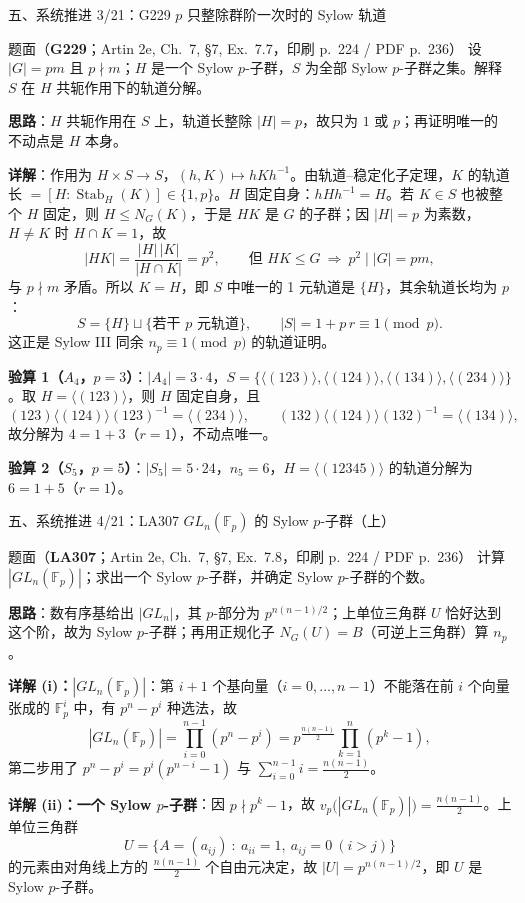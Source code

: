 \documentclass[aspectratio=169,10pt,fontset=none]{ctexbeamer}
\newcommand{\ex}[1]{\textcolor{accent}{\footnotesize\bfseries #1}}
\newcommand{\key}[1]{\textcolor{ink}{\bfseries #1}}
\begin{document}
\begin{frame}[t]{五、系统推进 3/21：G229 $p$ 只整除群阶一次时的 Sylow 轨道}
\label{ex:G229}
\scriptsize
\begin{block}{\footnotesize 题面（\ex{G229}；Artin 2e, Ch.~7, §7, Ex.~7.7，印刷 p.~224 / PDF p.~236）}
设 $|G|=pm$ 且 $p\nmid m$；$H$ 是一个 Sylow $p$-子群，$S$ 为全部 Sylow $p$-子群之集。解释 $S$ 在 $H$ 共轭作用下的轨道分解。
\end{block}
\key{思路}：$H$ 共轭作用在 $S$ 上，轨道长整除 $|H|=p$，故只为 $1$ 或 $p$；再证明唯一的不动点是 $H$ 本身。

\key{详解}：作用为 $H\times S\to S$，$(h,K)\mapsto hKh^{-1}$。由轨道–稳定化子定理，$K$ 的轨道长 $=[H:\operatorname{Stab}_H(K)]\in\{1,p\}$。$H$ 固定自身：$hHh^{-1}=H$。若 $K\in S$ 也被整个 $H$ 固定，则 $H\le N_G(K)$，于是 $HK$ 是 $G$ 的子群；因 $|H|=p$ 为素数，$H\ne K$ 时 $H\cap K=1$，故
\[ |HK|=\frac{|H|\,|K|}{|H\cap K|}=p^2,\qquad\text{但 }HK\le G\ \Longrightarrow\ p^2\mid|G|=pm, \]
与 $p\nmid m$ 矛盾。所以 $K=H$，即 $S$ 中唯一的 1 元轨道是 $\{H\}$，其余轨道长均为 $p$：
\[ S=\{H\}\sqcup\{\text{若干 }p\text{ 元轨道}\},\qquad |S|=1+p\,r\equiv1\pmod p. \]
这正是 Sylow III 同余 $n_p\equiv1\pmod p$ 的轨道证明。

\key{验算 1（$A_4$，$p=3$）}：$|A_4|=3\cdot4$，$S=\{\langle(123)\rangle,\langle(124)\rangle,\langle(134)\rangle,\langle(234)\rangle\}$。取 $H=\langle(123)\rangle$，则 $H$ 固定自身，且
\[ (123)\langle(124)\rangle(123)^{-1}=\langle(234)\rangle,\qquad (132)\langle(124)\rangle(132)^{-1}=\langle(134)\rangle, \]
故分解为 $4=1+3$（$r=1$），不动点唯一。

\key{验算 2（$S_5$，$p=5$）}：$|S_5|=5\cdot24$，$n_5=6$，$H=\langle(12345)\rangle$ 的轨道分解为 $6=1+5$（$r=1$）。
\end{frame}

\begin{frame}[t]{五、系统推进 4/21：LA307 $GL_n(\mathbb F_p)$ 的 Sylow $p$-子群（上）}
\label{ex:LA307}
\scriptsize
\begin{block}{\footnotesize 题面（\ex{LA307}；Artin 2e, Ch.~7, §7, Ex.~7.8，印刷 p.~224 / PDF p.~236）}
计算 $|GL_n(\mathbb F_p)|$；求出一个 Sylow $p$-子群，并确定 Sylow $p$-子群的个数。
\end{block}
\key{思路}：数有序基给出 $|GL_n|$，其 $p$-部分为 $p^{n(n-1)/2}$；上单位三角群 $U$ 恰好达到这个阶，故为 Sylow $p$-子群；再用正规化子 $N_G(U)=B$（可逆上三角群）算 $n_p$。

\key{详解 (i)：$|GL_n(\mathbb F_p)|$}：第 $i+1$ 个基向量（$i=0,\dots,n-1$）不能落在前 $i$ 个向量张成的 $\mathbb F_p^i$ 中，有 $p^n-p^i$ 种选法，故
\[ |GL_n(\mathbb F_p)|=\prod_{i=0}^{n-1}(p^n-p^i)=p^{\frac{n(n-1)}2}\prod_{k=1}^{n}(p^k-1), \]
第二步用了 $p^n-p^i=p^i(p^{n-i}-1)$ 与 $\sum_{i=0}^{n-1}i=\frac{n(n-1)}2$。

\key{详解 (ii)：一个 Sylow $p$-子群}：因 $p\nmid p^k-1$，故 $v_p\bigl(|GL_n(\mathbb F_p)|\bigr)=\frac{n(n-1)}2$。上单位三角群
\[ U=\{A=(a_{ij})\ :\ a_{ii}=1,\ a_{ij}=0\ (i>j)\} \]
的元素由对角线上方的 $\frac{n(n-1)}2$ 个自由元决定，故 $|U|=p^{n(n-1)/2}$，即 $U$ 是 Sylow $p$-子群。
\end{frame}
\end{document}
